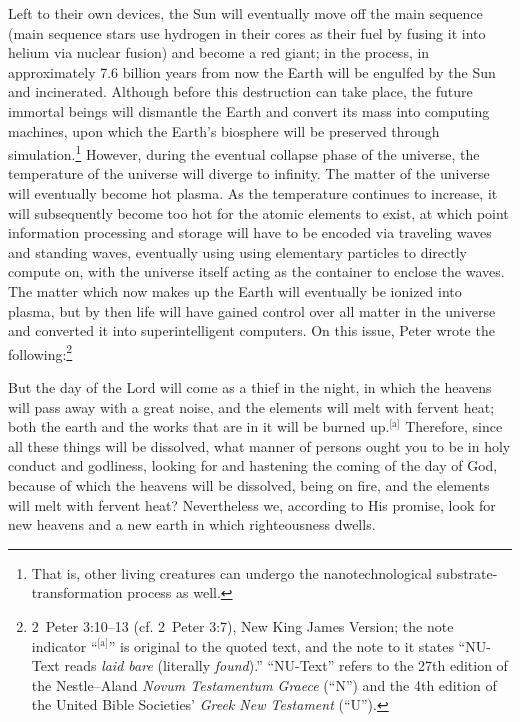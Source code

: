 \documentclass[letterpaper,12pt]{article}
\newenvironment{squote}
  {\small\quote}
  {\endquote\normalsize}
\begin{document}
Left to their own devices, the Sun will eventually move off the main sequence (main sequence stars use hydrogen in their cores as their fuel by fusing it into helium via nuclear fusion) and become a red giant; in the process, in approximately 7.6 billion years from now the Earth will be engulfed by the Sun and incinerated. Although before this destruction can take place, the future immortal beings will dismantle the Earth and convert its mass into computing machines, upon which the Earth's biosphere will be preserved through simulation.\footnote{That is, other living creatures can undergo the nanotechnological substrate-transformation process as well.} However, during the eventual collapse phase of the universe, the temperature of the universe will diverge to infinity. The matter of the universe will eventually become hot plasma. As the temperature continues to increase, it will subsequently become too hot for the atomic elements to exist, at which point information processing and storage will have to be encoded via traveling waves and standing waves, eventually using using elementary particles to directly compute on, with the universe itself acting as the container to enclose the waves. The matter which now makes up the Earth will eventually be ionized into plasma, but by then life will have gained control over all matter in the universe and converted it into superintelligent computers. On this issue, Peter wrote the following:\footnote{2~Peter 3:10--13 (cf. 2~Peter 3:7), New King James Version; the note indicator ``\( ^{\text{[a]}} \)'' is original to the quoted text, and the note to it states ``NU-Text reads \emph{laid bare} (literally \emph{found}).'' ``NU-Text'' refers to the 27th edition of the Nestle--Aland \emph{Novum Testamentum Graece} (``N'') and the 4th edition of the United Bible Societies' \emph{Greek New Testament} (``U'').}

\begin{squote}
But the day of the Lord will come as a thief in the night, in which the heavens will pass away with a great noise, and the elements will melt with fervent heat; both the earth and the works that are in it will be burned up.\( ^{\text{[a]}} \) Therefore, since all these things will be dissolved, what manner of persons ought you to be in holy conduct and godliness, looking for and hastening the coming of the day of God, because of which the heavens will be dissolved, being on fire, and the elements will melt with fervent heat? Nevertheless we, according to His promise, look for new heavens and a new earth in which righteousness dwells.
\end{squote}
\end{document}
